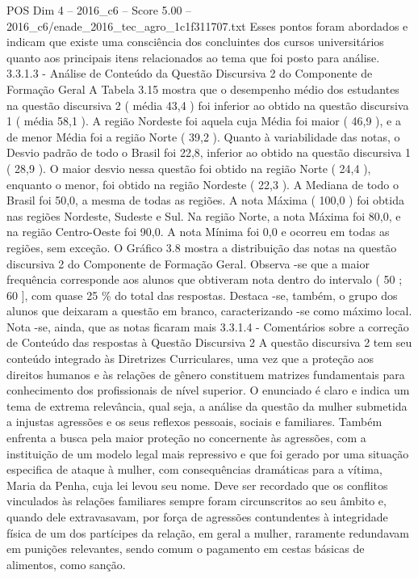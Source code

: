 \begin{textsample}{POS Dim 4 – 2016\_c6 – Score 5.00 – 2016\_c6/enade\_2016\_tec\_agro\_1c1f311707.txt}
Esses pontos foram abordados e indicam que existe uma consciência dos concluintes dos cursos universitários quanto aos principais itens relacionados ao tema que foi posto para análise. 3.3.1.3 - Análise de Conteúdo da Questão Discursiva 2 do Componente de Formação Geral A Tabela 3.15 mostra que o desempenho médio dos estudantes na questão discursiva 2 ( média 43,4 ) foi inferior ao obtido na questão discursiva 1 ( média 58,1 ).
A região Nordeste foi aquela cuja Média foi maior ( 46,9 ), e a de menor Média foi a região Norte ( 39,2 ).
Quanto à variabilidade das notas, o Desvio padrão de todo o Brasil foi 22,8, inferior ao obtido na questão discursiva 1 ( 28,9 ).
O maior desvio nessa questão foi obtido na região Norte ( 24,4 ), enquanto o menor, foi obtido na região Nordeste ( 22,3 ).
A Mediana de todo o Brasil foi 50,0, a mesma de todas as regiões.
A nota Máxima ( 100,0 ) foi obtida nas regiões Nordeste, Sudeste e Sul.
Na região Norte, a nota Máxima foi 80,0, e na região Centro-Oeste foi 90,0.
A nota Mínima foi 0,0 e ocorreu em todas as regiões, sem exceção.
O Gráfico 3.8 mostra a distribuição das notas na questão discursiva 2 do Componente de Formação Geral.
Observa -se que a maior frequência corresponde aos alunos que obtiveram nota dentro do intervalo ( 50 ; 60 ], com quase 25 \% do total das respostas.
Destaca -se, também, o grupo dos alunos que deixaram a questão em branco, caracterizando -se como máximo local.
Nota -se, ainda, que as notas ficaram mais 3.3.1.4 - Comentários sobre a correção de Conteúdo das respostas à Questão Discursiva 2 A questão discursiva 2 tem seu conteúdo integrado às Diretrizes Curriculares, uma vez que a proteção aos direitos humanos e às relações de gênero constituem matrizes fundamentais para conhecimento dos profissionais de nível superior.
O enunciado é claro e indica um tema de extrema relevância, qual seja, a análise da questão da mulher submetida a injustas agressões e os seus reflexos pessoais, sociais e familiares.
Também enfrenta a busca pela maior proteção no concernente às agressões, com a instituição de um modelo legal mais repressivo e que foi gerado por uma situação especifica de ataque à mulher, com consequências dramáticas para a vítima, Maria da Penha, cuja lei levou seu nome.
Deve ser recordado que os conflitos vinculados às relações familiares sempre foram circunscritos ao seu âmbito e, quando dele extravasavam, por força de agressões contundentes à integridade física de um dos partícipes da relação, em geral a mulher, raramente redundavam em punições relevantes, sendo comum o pagamento em cestas básicas de alimentos, como sanção.

\end{textsample}
